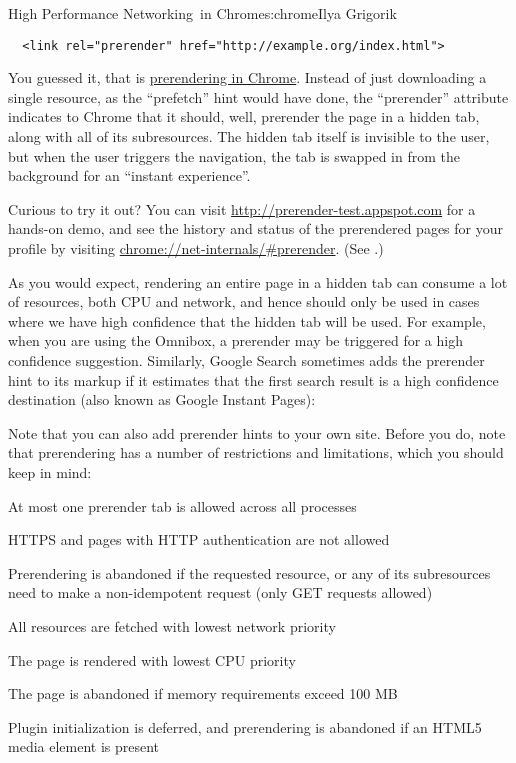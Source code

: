 \begin{aosachapter}{High Performance Networking~in Chrome}{s:chrome}{Ilya Grigorik}
\begin{verbatim}
  <link rel="prerender" href="http://example.org/index.html">
\end{verbatim}

You guessed it, that is
\href{https://developers.google.com/chrome/whitepapers/prerender}{prerendering
in Chrome}. Instead of just downloading a single resource, as the
``prefetch'' hint would have done, the ``prerender'' attribute indicates
to Chrome that it should, well, prerender the page in a hidden tab,
along with all of its subresources. The hidden tab itself is invisible
to the user, but when the user triggers the navigation, the tab is
swapped in from the background for an ``instant experience''.

Curious to try it out? You can visit
\url{http://prerender-test.appspot.com} for
a hands-on demo, and see the history and status of the prerendered pages
for your profile by visiting
\url{chrome://net-internals/\#prerender}. (See
.)


As you would expect, rendering an entire page in a hidden tab can
consume a lot of resources, both CPU and network, and hence should only
be used in cases where we have high confidence that the hidden tab will
be used. For example, when you are using the Omnibox, a prerender may be
triggered for a high confidence suggestion. Similarly, Google Search
sometimes adds the prerender hint to its markup if it estimates that the
first search result is a high confidence destination (also known as
Google Instant Pages):

Note that you can also add prerender hints to your own site. Before you
do, note that prerendering has a number of restrictions and limitations,
which you should keep in mind:

\begin{aosaitemize}

\item
  At most one prerender tab is allowed across all processes
\item
  HTTPS and pages with HTTP authentication are not allowed
\item
  Prerendering is abandoned if the requested resource, or any of its
  subresources need to make a non-idempotent request (only GET requests
  allowed)
\item
  All resources are fetched with lowest network priority
\item
  The page is rendered with lowest CPU priority
\item
  The page is abandoned if memory requirements exceed 100 MB
\item
  Plugin initialization is deferred, and prerendering is abandoned if an
  HTML5 media element is present
\end{aosaitemize}


\end{aosachapter}
